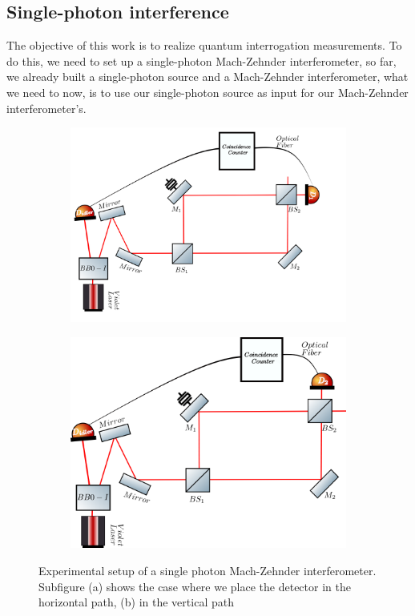 \documentclass[12pt]{book}
\begin{document}
\subsection{Single-photon interference}


The objective of this work is to realize quantum interrogation measurements. To do this, we need to set up a single-photon Mach-Zehnder interferometer, so far, we already built a single-photon source and a Mach-Zehnder interferometer, what we need to now, is to use our single-photon source as input for our Mach-Zehnder interferometer's.


\begin{figure}[t!]
\centering
\begin{subfigure}[b]{0.45\linewidth}
\includegraphics[scale=0.25]{images/machzehnder_single1.png}
\caption{}
\end{subfigure}
\begin{subfigure}[b]{0.45\linewidth}
\includegraphics[scale=0.25]{images/machzehnder_single2.png}
\caption{}
\end{subfigure}
\caption{Experimental setup of a single photon Mach-Zehnder interferometer. Subfigure (a) shows the case where we place the detector in the horizontal path, (b) in the vertical path}
\label{newsingle}
\end{figure}
\end{document}
